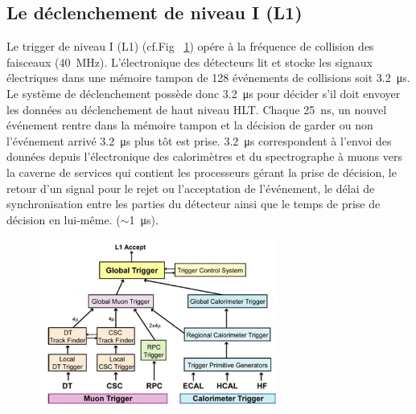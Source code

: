 \subsection{Le déclenchement de niveau I (L1)}
Le trigger de niveau I (L1) (cf.Fig~ \ref{L1}) opére à la fréquence de collision des faisceaux (\SI{40}{\mega\hertz}). L'électronique des détecteurs lit et stocke les  signaux électriques dans une mémoire tampon de \num{128} événements de collisions soit \SI{3.2}{\micro\second}. Le système de déclenchement possède donc \SI{3.2}{\micro\second} pour  décider s'il doit envoyer les données au déclenchement de haut niveau HLT. Chaque \SI{25}{\nano\second}, un nouvel événement rentre dans la mémoire tampon et la décision de garder ou non l'événement arrivé \SI{3.2}{\micro\second} plus tôt est prise. \SI{3.2}{\micro\second} correspondent à l'envoi des données depuis l'électronique des calorimètres et du spectrographe à muons vers la caverne de services qui contient les processeurs gérant la prise de décision, le retour d'un signal pour le rejet ou l'acceptation de l'événement, le délai de synchronisation entre les parties du détecteur ainsi que le temps de prise de décision en lui-même. ($\sim$\SI{1}{\micro\second}). 

	  \begin{figure}[ht!]
	\centering
	\includegraphics[width=0.70\textwidth]{CMS/L1.png}
	\label{L1}
\end{figure}

